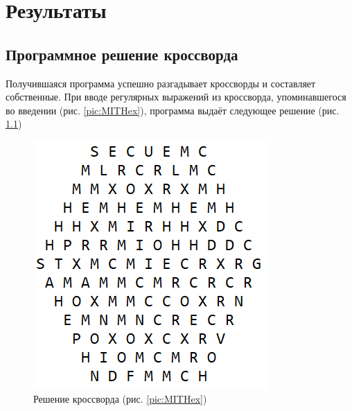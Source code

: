 \documentclass[12pt]{report}
\begin{document}
\chapter{Результаты}
\section{Программное решение кроссворда}
Получившаяся программа успешно разгадывает кроссворды и составляет собственные. При вводе регулярных выражений из кроссворда, упоминавшегося во введении (рис. \ref{pic:MITHex}), программа выдаёт следующее решение (рис. \ref{pic:MITSolution})
\begin{figure}[ht!]
 \centering
    \includegraphics[scale=1.0]{HexagonalOutput1.PNG}
    \caption{\label{pic:MITSolution}Решение кроссворда (рис. \ref{pic:MITHex})}
\end{figure}
\end{document}
